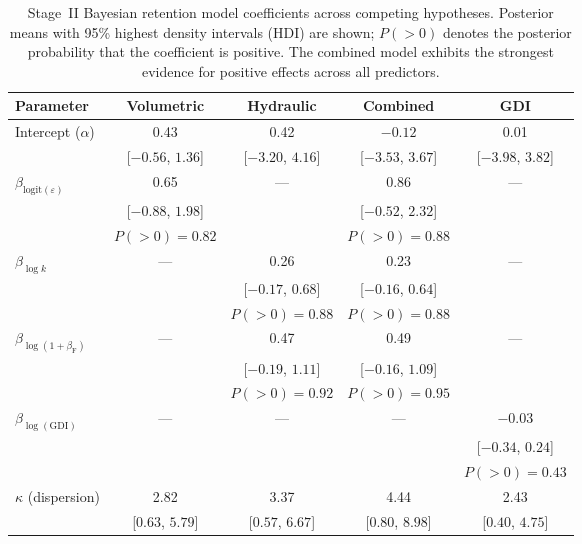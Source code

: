 \begin{table}[H]
\caption{Stage~II Bayesian retention model coefficients across competing hypotheses. Posterior means with 95\% highest density intervals (HDI) are shown; $P(>0)$ denotes the posterior probability that the coefficient is positive. The combined model exhibits the strongest evidence for positive effects across all predictors.}
\label{tab:stage2_consolidated}
\centering
\small
\begin{tabular}{lcccc}
\toprule
Parameter & Volumetric & Hydraulic & Combined & GDI \\
\midrule
Intercept ($\alpha$) & 0.43 & 0.42 & $-0.12$ & 0.01 \\
 & [$-0.56$, $1.36$] & [$-3.20$, $4.16$] & [$-3.53$, $3.67$] & [$-3.98$, $3.82$] \\[0.5em]
$\beta_{\mathrm{logit}(\varepsilon)}$ & 0.65 & --- & 0.86 & --- \\
 & [$-0.88$, $1.98$] & & [$-0.52$, $2.32$] & \\
 & $P(>0)=0.82$ & & $P(>0)=0.88$ & \\[0.5em]
$\beta_{\log k}$ & --- & 0.26 & 0.23 & --- \\
 & & [$-0.17$, $0.68$] & [$-0.16$, $0.64$] & \\
 & & $P(>0)=0.88$ & $P(>0)=0.88$ & \\[0.5em]
$\beta_{\log(1+\beta_{\mathrm{F}})}$ & --- & 0.47 & 0.49 & --- \\
 & & [$-0.19$, $1.11$] & [$-0.16$, $1.09$] & \\
 & & $P(>0)=0.92$ & $P(>0)=0.95$ & \\[0.5em]
$\beta_{\log(\mathrm{GDI})}$ & --- & --- & --- & $-0.03$ \\
 & & & & [$-0.34$, $0.24$] \\
 & & & & $P(>0)=0.43$ \\[0.5em]
$\kappa$ (dispersion) & 2.82 & 3.37 & 4.44 & 2.43 \\
 & [$0.63$, $5.79$] & [$0.57$, $6.67$] & [$0.80$, $8.98$] & [$0.40$, $4.75$] \\
\bottomrule
\end{tabular}
\end{table}
